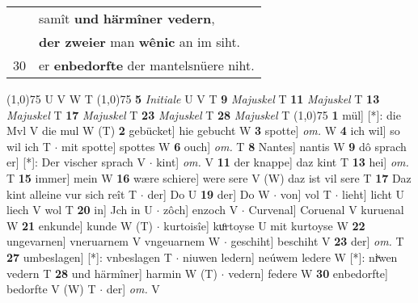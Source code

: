 \documentclass[8pt,a4paper,notitlepage]{article}
\begin{document}
\begin{table}[ht]
\begin{minipage}[t]{0.5\linewidth}
\begin{tabular}{rl}
 & samît \textbf{und} \textbf{härmîner vedern},\\ 
 & \textbf{der zweier} man \textbf{wênic} an im siht.\\ 
30 & er \textbf{en}\textbf{bedorfte} der mantelsnüere niht.\\ 
\end{tabular}
\scriptsize
\line(1,0){75} \newline
U V W T \newline
\line(1,0){75} \newline
\textbf{5} \textit{Initiale} U V T  \textbf{9} \textit{Majuskel} T  \textbf{11} \textit{Majuskel} T  \textbf{13} \textit{Majuskel} T  \textbf{17} \textit{Majuskel} T  \textbf{23} \textit{Majuskel} T  \textbf{28} \textit{Majuskel} T  \newline
\line(1,0){75} \newline
\textbf{1} mül] [*]: die Mvl V die mul W (T) \textbf{2} gebücket] hie gebucht W \textbf{3} spotte] \textit{om.} W \textbf{4} ich wil] so wil ich T  $\cdot$ mit spotte] spottes W \textbf{6} ouch] \textit{om.} T \textbf{8} Nantes] nantis W \textbf{9} dô sprach er] [*]: Der vischer sprach V  $\cdot$ kint] \textit{om.} V \textbf{11} der knappe] daz kint T \textbf{13} hei] \textit{om.} T \textbf{15} immer] mein W \textbf{16} wære schiere] were sere V (W) daz ist vil sere T \textbf{17} Daz kint alleine vur sich reît T  $\cdot$ der] Do U \textbf{19} der] Do W  $\cdot$ von] vol T  $\cdot$ lieht] licht U liech V wol T \textbf{20} in] Jch in U  $\cdot$ zôch] enzoch V  $\cdot$ Curvenal] Coruenal V kuruenal W \textbf{21} enkunde] kunde W (T)  $\cdot$ kurtoisîe] kuͦrtoyse U mit kurtoyse W \textbf{22} ungevarnen] vneruarnem V vngeuarnem W  $\cdot$ geschiht] beschiht V \textbf{23} der] \textit{om.} T \textbf{27} umbeslagen] [*]: vnbeslagen T  $\cdot$ niuwen ledern] neúwem ledere W [*]: niͮwen vedern T \textbf{28} und härmîner] harmin W (T)  $\cdot$ vedern] federe W \textbf{30} enbedorfte] bedorfte V (W) T  $\cdot$ der] \textit{om.} V \newline
\end{minipage}
\end{table}
\end{document}

